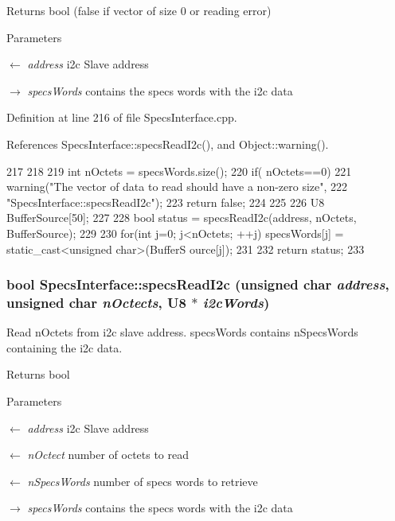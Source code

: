 \begin{DoxyReturn}{Returns}
bool (false if vector of size 0 or reading error) 
\end{DoxyReturn}

\begin{DoxyParams}{Parameters}
\item[\mbox{$\leftarrow$} {\em address}]i2c Slave address \item[\mbox{$\rightarrow$} {\em specsWords}]contains the specs words with the i2c data \end{DoxyParams}


Definition at line 216 of file SpecsInterface.cpp.

References SpecsInterface::specsReadI2c(), and Object::warning().


\begin{DoxyCode}
217                                                                        {
218 
219   int nOctets = specsWords.size();
220   if( nOctets==0) {
221     warning("The vector of data to read should have a non-zero size",
222             "SpecsInterface::specsReadI2c");
223     return false;
224   }
225 
226   U8 BufferSource[50];
227  
228   bool status = specsReadI2c(address, nOctets, BufferSource);
229 
230   for(int j=0; j<nOctets; ++j) specsWords[j] = static_cast<unsigned char>(BufferS
      ource[j]);
231 
232   return status;
233 }
\end{DoxyCode}
\hypertarget{classSpecsInterface_a7e9a0fe69a998e624ca2d7339b61bcb5}{
\subsubsection[{specsReadI2c}]{\setlength{\rightskip}{0pt plus 5cm}bool SpecsInterface::specsReadI2c (unsigned char {\em address}, \/  unsigned char {\em nOctects}, \/  {\bf U8} $\ast$ {\em i2cWords})}}
\label{classSpecsInterface_a7e9a0fe69a998e624ca2d7339b61bcb5}
Read nOctets from i2c slave address. specsWords contains nSpecsWords containing the i2c data.

\begin{DoxyReturn}{Returns}
bool 
\end{DoxyReturn}

\begin{DoxyParams}{Parameters}
\item[\mbox{$\leftarrow$} {\em address}]i2c Slave address \item[\mbox{$\leftarrow$} {\em nOctect}]number of octets to read \item[\mbox{$\leftarrow$} {\em nSpecsWords}]number of specs words to retrieve \item[\mbox{$\rightarrow$} {\em specsWords}]contains the specs words with the i2c data \end{DoxyParams}


